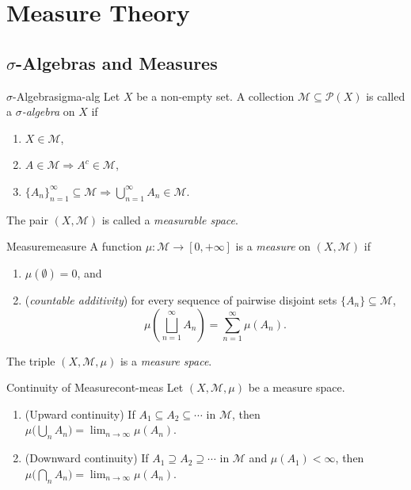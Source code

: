 \section{Measure Theory}

\subsection{$\sigma$-Algebras and Measures}

\begin{definition}{$\sigma$-Algebra}{sigma-alg}
    Let $X$ be a non-empty set. A collection $\mathcal{M} \subseteq \mathcal{P}(X)$
    is called a \emph{$\sigma$-algebra} on $X$ if
    \begin{enumerate}
        \item $X \in \mathcal{M}$,
        \item $A \in \mathcal{M} \Rightarrow A^c \in \mathcal{M}$,
        \item $\{A_n\}_{n=1}^{\infty} \subseteq \mathcal{M}
              \Rightarrow \bigcup_{n=1}^{\infty} A_n \in \mathcal{M}$.
    \end{enumerate}
    The pair $(X, \mathcal{M})$ is called a \emph{measurable space}.
\end{definition}

\begin{definition}{Measure}{measure}
    A function $\mu : \mathcal{M} \to [0,+\infty]$ is a \emph{measure} on
    $(X,\mathcal{M})$ if
    \begin{enumerate}
        \item $\mu(\emptyset) = 0$, and
        \item (\emph{countable additivity}) for every sequence of pairwise
              disjoint sets $\{A_n\} \subseteq \mathcal{M}$,
              \[
                  \mu\!\left(\bigsqcup_{n=1}^{\infty} A_n\right)
                  = \sum_{n=1}^{\infty} \mu(A_n).
              \]
    \end{enumerate}
    The triple $(X, \mathcal{M}, \mu)$ is a \emph{measure space}.
\end{definition}


\begin{theorem}{Continuity of Measure}{cont-meas}
    Let $(X,\mathcal{M},\mu)$ be a measure space.
    \begin{enumerate}
        \item \textup{(Upward continuity)}  If $A_1 \subseteq A_2 \subseteq \cdots$
              in $\mathcal{M}$, then
              $\mu\!\bigl(\bigcup_n A_n\bigr) = \lim_{n\to\infty}\mu(A_n)$.
        \item \textup{(Downward continuity)}  If $A_1 \supseteq A_2 \supseteq \cdots$
              in $\mathcal{M}$ and $\mu(A_1)<\infty$, then
              $\mu\!\bigl(\bigcap_n A_n\bigr) = \lim_{n\to\infty}\mu(A_n)$.
    \end{enumerate}
\end{theorem}

